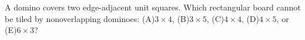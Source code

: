 A domino covers two edge-adjacent unit squares. Which rectangular board cannot be tiled by nonoverlapping dominoes: (A)$3\times4$, (B)$3\times5$, (C)$4\times4$, (D)$4\times5$, or (E)$6\times3$?
